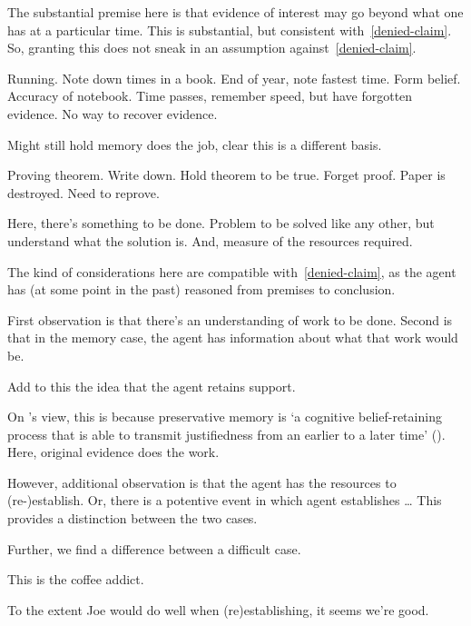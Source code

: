 \begin{note}
  The substantial premise here is that evidence of interest may go beyond what one has at a particular time.
  This is substantial, but consistent with~\ref{denied-claim}.
  So, granting this does not sneak in an assumption against~\ref{denied-claim}.
\end{note}

\begin{note}
  Running.
  Note down times in a book.
  End of year, note fastest time.
  Form belief.
  Accuracy of notebook.
  Time passes, remember speed, but have forgotten evidence.
  No way to recover evidence.

  Might still hold memory does the job, clear this is a different basis.
\end{note}

\begin{note}
  Proving theorem.
  Write down.
  Hold theorem to be true.
  Forget proof.
  Paper is destroyed.
  Need to reprove.

  Here, there's something to be done.
  Problem to be solved like any other, but understand what the solution is.
  And, measure of the resources required.
\end{note}

\begin{note}[~\ref{denied-claim}]
  The kind of considerations here are compatible with~\ref{denied-claim}, as the agent has (at some point in the past) reasoned from premises to conclusion.
\end{note}

\begin{note}
  First observation is that there's an understanding of work to be done.
  Second is that in the memory case, the agent has information about what that work would be.

  Add to this the idea that the agent retains support.

  On \citeauthor{Goldman:2011vn}'s view, this is because preservative memory is `a cognitive belief-retaining process that is able to transmit justiﬁedness from an earlier to a later time' (\citeyear[261]{Goldman:2011vn}).
  Here, original evidence does the work.

  However, additional observation is that the agent has the resources to (re-)establish.
  Or, there is a potentive event in which agent establishes \dots
  This provides a distinction between the two cases.

  Further, we find a difference between a difficult case.

  This is the coffee addict.

  To the extent Joe would do well when (re)establishing, it seems we're good.
\end{note}


